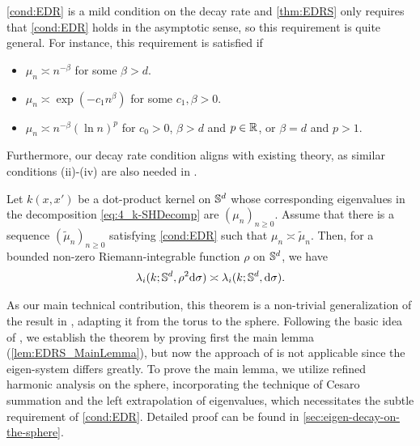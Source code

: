 \begin{remark}
  \label{rem:EDR_Condition}
  \cref{cond:EDR} is a mild condition on the decay rate and \cref{thm:EDRS} only requires that \cref{cond:EDR} holds in the asymptotic sense,
  so this requirement is quite general.
  For instance, this requirement is satisfied if
  \begin{itemize}
    \item $\mu_n \asymp n^{-\beta}$ for some $\beta > d$.
    \item $\mu_n \asymp \exp(-c_1 n^{\beta})$ for some $c_1, \beta > 0$.
    \item $\mu_n \asymp n^{-\beta} (\ln n)^p$ for $c_0 > 0$, $\beta > d$ and $p \in \mathbb{R}$, or $\beta = d$ and $p > 1$.
  \end{itemize}
  Furthermore, our decay rate condition aligns with existing theory,
  as similar conditions (ii)-(iv) are also needed in \citet{widom1963_AsymptoticBehavior}.
\end{remark}

\begin{theorem}
  \label{thm:EDRS}
  Let $k(x,x')$ be a dot-product kernel on $\mathbb{S}^d$
  whose corresponding eigenvalues in the decomposition \cref{eq:4_k-SHDecomp} are $(\mu_n)_{n \geq 0}$.
  Assume that there is a sequence $(\tilde{\mu}_n)_{n \geq 0}$ satisfying \cref{cond:EDR} such that $\mu_n \asymp \tilde{\mu}_n$.
  Then, for a bounded non-zero Riemann-integrable function $\rho$ on $\mathbb{S}^d$,
  we have
  \begin{align}
    \lambda_i(k;\mathbb{S}^d, \rho^2 \dd \sigma)
    \asymp \lambda_i(k;\mathbb{S}^d, \dd \sigma).
  \end{align}
\end{theorem}

As our main technical contribution,
this theorem is a non-trivial generalization of the result in \citet{widom1963_AsymptoticBehavior},
adapting it from the torus to the sphere.
Following the basic idea of \citet{widom1963_AsymptoticBehavior}, we establish the theorem by proving first the main lemma (\cref{lem:EDRS_MainLemma}),
but now the approach of \citet{widom1963_AsymptoticBehavior} is not applicable since the eigen-system differs greatly.
To prove the main lemma, we utilize refined harmonic analysis on the sphere,
incorporating the technique of Cesaro summation and the left extrapolation of eigenvalues,
which necessitates the subtle requirement of \cref{cond:EDR}.
Detailed proof can be found in \cref{sec:eigen-decay-on-the-sphere}.


